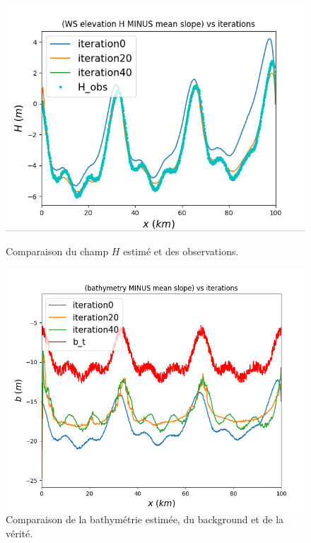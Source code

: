 \documentclass{article}
\begin{document}
\begin{figure}[H]
    \vspace{0.5cm}
    
    \begin{minipage}[b]{0.48\linewidth}
        \centering
        \includegraphics[width=\linewidth]{Images_Ayoub/With_Regularisation/Decreasing_Alpha/H_Comparaison.png}
        \caption{Comparaison du champ \(H\) estimé et des observations.}
        \label{fig:dec-h}
    \end{minipage}
    \hfill
    \begin{minipage}[b]{0.48\linewidth}
        \centering
        \includegraphics[width=\linewidth]{Images_Ayoub/With_Regularisation/Decreasing_Alpha/b_Comparaison.png}
        \caption{Comparaison de la bathymétrie estimée, du background et de la vérité.}
        \label{fig:dec-b}
    \end{minipage}
    

\end{figure}
\end{document}

